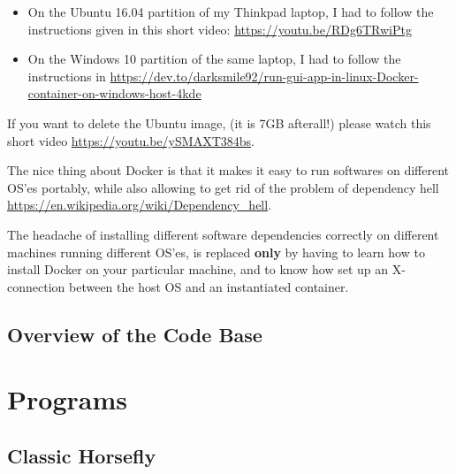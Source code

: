 \documentclass[12pt]{report}
\begin{document}
\begin{alphalist}
\begin{itemize}
\item On the Ubuntu 16.04 partition of my Thinkpad laptop, I had to follow the instructions given in this short video: \url{https://youtu.be/RDg6TRwiPtg}
\item On the Windows 10 partition of the same laptop, I had to follow the instructions in 
\url{https://dev.to/darksmile92/run-gui-app-in-linux-Docker-container-on-windows-host-4kde}

\end{itemize}

\end{alphalist}


If you want to delete the Ubuntu image, (it is 7GB afterall!) please watch this short video 
\url{https://youtu.be/ySMAXT384bs}.

The nice thing about Docker is that it makes it easy to run softwares on different OS'es portably, while 
also allowing to get rid of the problem of dependency hell \url{https://en.wikipedia.org/wiki/Dependency_hell}. 

The headache of installing different software dependencies correctly on different machines running different OS'es, 
is replaced \textbf{only} by having to learn how to install Docker on your particular machine, and to know how 
set up an X-connection between the host OS and an instantiated container. \chapter{Overview of the Code Base}
\part{Programs}
\chapter{Classic Horsefly}
\label{chap:classic-horsefly}

\newchunk \blindtext
\end{document}
